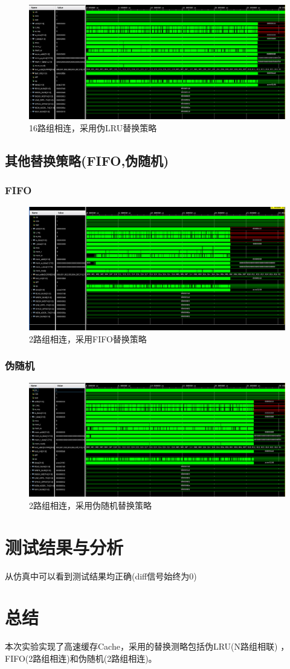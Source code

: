 \documentclass[12pt,a4paper]{ctexart}
\begin{document}
\begin{figure}[H]
    \centering
    \includegraphics[scale=0.4]{pic/lru_16.png}
    \caption{16路组相连，采用伪LRU替换策略}
\end{figure}
\subsection{其他替换策略(FIFO,伪随机)}
\subsubsection{FIFO}
\begin{figure}[H]
    \centering
    \includegraphics[scale=0.4]{pic/fifo.png}
    \caption{2路组相连，采用FIFO替换策略}
\end{figure}
\subsubsection{伪随机}
\begin{figure}[H]
    \centering
    \includegraphics[scale=0.4]{pic/random.png}
    \caption{2路组相连，采用伪随机替换策略}
\end{figure}
\section{测试结果与分析}
从仿真中可以看到测试结果均正确(diff信号始终为0)
\section{总结}
本次实验实现了高速缓存Cache，采用的替换测略包括伪LRU(N路组相联)
，FIFO(2路组相连)和伪随机(2路组相连)。
\end{document}
